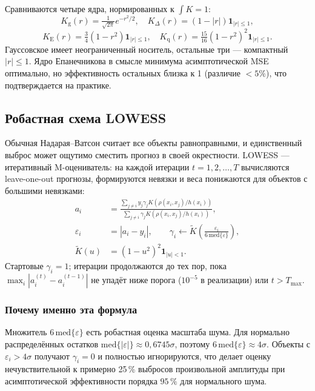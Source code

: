 \documentclass[12pt,a4paper]{article}
\theoremstyle{definition}
\theoremstyle{remark}
\begin{document}
Сравниваются четыре ядра, нормированных к $\int K=1$:
\[
    K_{\mathrm{g}}(r)=\tfrac{1}{\sqrt{2\pi}}e^{-r^{2}/2},\quad
    K_{\Delta}(r)=(1-|r|)\mathbf{1}_{|r|\leq 1},
\]
\[
    K_{\mathrm{E}}(r)=\tfrac{3}{4}(1-r^{2})\mathbf{1}_{|r|\leq 1},\quad
    K_{\mathrm{q}}(r)=\tfrac{15}{16}(1-r^{2})^{2}\mathbf{1}_{|r|\leq 1}.
\]
Гауссовское имеет неограниченный носитель, остальные три --- компактный
$|r|\leq 1$. Ядро Епанечникова в смысле минимума асимптотической MSE
оптимально, но эффективность остальных близка к 1 (различие $<5\%$), что
подтверждается на практике.

\subsection{Робастная схема LOWESS}

Обычная Надарая--Ватсон считает все объекты равноправными, и единственный
выброс может ощутимо сместить прогноз в своей окрестности. LOWESS ---
итеративный M-оцениватель: на каждой итерации $t=1,2,\dots,T$ вычисляются
leave-one-out прогнозы, формируются невязки и веса понижаются для объектов
с большими невязками:
\begin{align}
    a_{i} &= \frac{\sum_{j\neq i}y_{j}\gamma_{j}K(\rho(x_{i},x_{j})/h(x_{i}))}
                  {\sum_{j\neq i}\gamma_{j}K(\rho(x_{i},x_{j})/h(x_{i}))},\\
    \varepsilon_{i} &= |a_{i}-y_{i}|,\qquad
    \gamma_{i}\leftarrow \widetilde K\!\left(\frac{\varepsilon_{i}}{6\,\mathrm{med}\{\varepsilon\}}\right),\\
    \widetilde K(u) &= (1-u^{2})^{2}\mathbf{1}_{|u|<1}.
\end{align}
Стартовые $\gamma_{i}=1$; итерации продолжаются до тех пор, пока
$\max_{i}|a_{i}^{(t)}-a_{i}^{(t-1)}|$ не упадёт ниже порога ($10^{-5}$
в реализации) или $t>T_{\max}$.

\subsubsection{Почему именно эта формула}

Множитель $6\,\mathrm{med}\{\varepsilon\}$ есть робастная оценка масштаба
шума. Для нормально распределённых остатков
$\mathrm{med}\{|\varepsilon|\}\approx 0{,}6745\sigma$, поэтому
$6\,\mathrm{med}\{\varepsilon\}\approx 4\sigma$. Объекты с
$\varepsilon_{i}>4\sigma$ получают $\gamma_{i}=0$ и полностью игнорируются,
что делает оценку нечувствительной к примерно 25\,\% выбросов произвольной
амплитуды при асимптотической эффективности порядка $95\,\%$ для нормального
шума.
\end{document}

